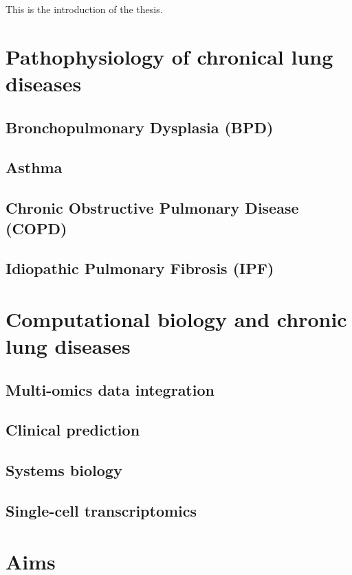 This is the introduction of the thesis.

\section{Pathophysiology of chronical lung diseases}
    \subsection{Bronchopulmonary Dysplasia (BPD)}
    \subsection{Asthma}
    \subsection{Chronic Obstructive Pulmonary Disease (COPD)}
    \subsection{Idiopathic Pulmonary Fibrosis (IPF)}

\section{Computational biology and chronic lung diseases}
    \subsection{Multi-omics data integration}
    \subsection{Clinical prediction}
    \subsection{Systems biology}
    \subsection{Single-cell transcriptomics}
    
\section{Aims}
